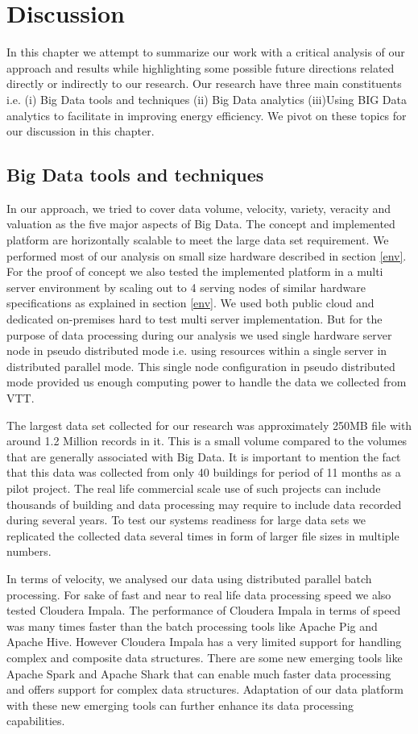 \chapter{Discussion}
\label{chapter:discussion}
In this chapter we attempt to summarize our work with a critical analysis of our approach and results while highlighting some possible future directions related directly or indirectly to our research. Our research have three main constituents i.e. (i) Big Data tools and techniques (ii) Big Data analytics (iii)Using BIG Data analytics to facilitate in improving energy efficiency. We pivot on these topics for our discussion in this chapter.    

\section{Big Data tools and techniques}
In our approach, we tried to cover data volume, velocity, variety, veracity and valuation as the five major aspects of Big Data. The concept and implemented platform are horizontally scalable to meet the large data set requirement. We performed most of our analysis on small size hardware described in section \ref{env}. For the proof of concept we also tested the implemented platform in a multi server environment by scaling out to 4 serving nodes of similar hardware specifications as explained in section \ref{env}. We used both public cloud and dedicated on-premises hard to test multi server implementation. But for the purpose of data processing during our analysis we used single hardware server node in pseudo distributed mode i.e. using resources within a single server in distributed parallel mode. This single node configuration in pseudo distributed mode provided us enough computing power to handle the data we collected from VTT. 

The largest data set collected for our research was approximately 250MB file with around 1.2 Million records in it. This is a small volume compared to the volumes that are generally associated with Big Data. It is important to mention the fact that this data was collected from only 40 buildings for period of 11 months as a pilot project. The real life commercial scale use of such projects can include thousands of building and data processing may require to include data recorded  during several years. To test our systems readiness for large data sets we replicated the collected data several times in form of larger file sizes in multiple numbers. 

In terms of velocity, we analysed our data using distributed parallel batch processing. For sake of fast and near to real life data processing speed we also tested Cloudera Impala. The performance of Cloudera Impala in terms of speed was many times faster than the batch processing tools like Apache Pig and Apache Hive.  However Cloudera Impala has a very limited support for handling complex and composite data structures. There are some new emerging tools like Apache Spark and Apache Shark that can enable much faster data processing and offers support for complex data structures. Adaptation of our data platform with these new emerging tools can further enhance its data processing capabilities. 

